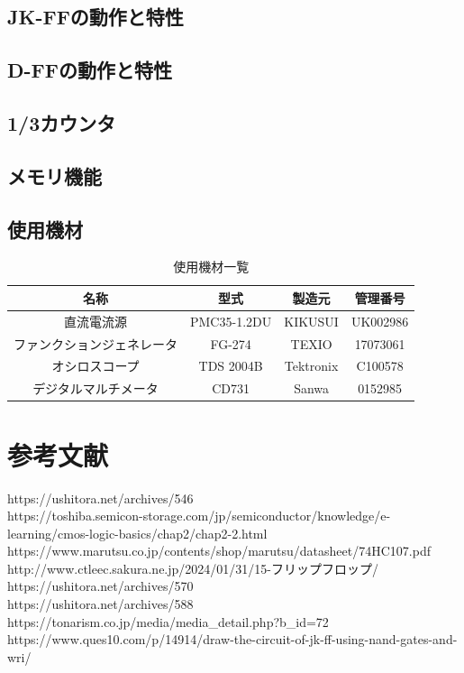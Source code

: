 \documentclass{jlreq}
\numberwithin{equation}{section}
\begin{document}
\subsection{JK-FFの動作と特性}

\subsection{D-FFの動作と特性}

\subsection{1/3カウンタ}

\subsection{メモリ機能}

\subsection{使用機材}
\begin{table}[H]
  \centering
  \caption{使用機材一覧}
  \begin{tabular}{|c|c|c|c|}
    \hline
    名称 & 型式 & 製造元 & 管理番号 \\ \hline
    直流電流源 & PMC35-1.2DU & KIKUSUI & UK002986 \\ \hline
    ファンクションジェネレータ & FG-274 & TEXIO & 17073061 \\ \hline
    オシロスコープ & TDS 2004B & Tektronix & C100578 \\ \hline
    デジタルマルチメータ & CD731 & Sanwa & 0152985 \\ \hline
  \end{tabular}
\end{table}

\section{参考文献}
https://ushitora.net/archives/546 \\
https://toshiba.semicon-storage.com/jp/semiconductor/knowledge/e-learning/cmos-logic-basics/chap2/chap2-2.html \\
https://www.marutsu.co.jp/contents/shop/marutsu/datasheet/74HC107.pdf \\
http://www.ctleec.sakura.ne.jp/2024/01/31/15-フリップフロップ/ \\
https://ushitora.net/archives/570 \\
https://ushitora.net/archives/588 \\
https://tonarism.co.jp/media/media\_detail.php?b\_id=72 \\
https://www.ques10.com/p/14914/draw-the-circuit-of-jk-ff-using-nand-gates-and-wri/ \\
\end{document}
